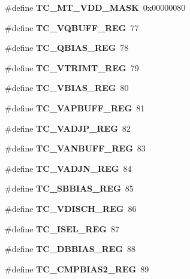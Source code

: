 \begin{DoxyCompactItemize}
\#define {\bfseries T\+C\+\_\+\+M\+T\+\_\+\+V\+D\+D\+\_\+\+M\+A\+SK}~0x00000080
\item 
\mbox{\label{_t_a_r_g_e_t_c___register_map_8h_a9479dfc6b7ea16de75f3f484bc33eb85}} 
\#define {\bfseries T\+C\+\_\+\+V\+Q\+B\+U\+F\+F\+\_\+\+R\+EG}~77
\item 
\mbox{\label{_t_a_r_g_e_t_c___register_map_8h_a851119f869d726fd2f491fe1a2f73c88}} 
\#define {\bfseries T\+C\+\_\+\+Q\+B\+I\+A\+S\+\_\+\+R\+EG}~78
\item 
\mbox{\label{_t_a_r_g_e_t_c___register_map_8h_ad8c2147fbc76ce5accfaf914e5618172}} 
\#define {\bfseries T\+C\+\_\+\+V\+T\+R\+I\+M\+T\+\_\+\+R\+EG}~79
\item 
\mbox{\label{_t_a_r_g_e_t_c___register_map_8h_aefc11a0ffdb29d47da553b0050f53ca9}} 
\#define {\bfseries T\+C\+\_\+\+V\+B\+I\+A\+S\+\_\+\+R\+EG}~80
\item 
\mbox{\label{_t_a_r_g_e_t_c___register_map_8h_a3b79a0397aab3ec3d35cf94070a9c730}} 
\#define {\bfseries T\+C\+\_\+\+V\+A\+P\+B\+U\+F\+F\+\_\+\+R\+EG}~81
\item 
\mbox{\label{_t_a_r_g_e_t_c___register_map_8h_a39420f232221429698f4a5d6b0316056}} 
\#define {\bfseries T\+C\+\_\+\+V\+A\+D\+J\+P\+\_\+\+R\+EG}~82
\item 
\mbox{\label{_t_a_r_g_e_t_c___register_map_8h_a715bc2cab8b7e6b65146677373a30bf4}} 
\#define {\bfseries T\+C\+\_\+\+V\+A\+N\+B\+U\+F\+F\+\_\+\+R\+EG}~83
\item 
\mbox{\label{_t_a_r_g_e_t_c___register_map_8h_a6ada6f68b8bb6491096841e849bdaacc}} 
\#define {\bfseries T\+C\+\_\+\+V\+A\+D\+J\+N\+\_\+\+R\+EG}~84
\item 
\mbox{\label{_t_a_r_g_e_t_c___register_map_8h_aeea124acb8e9b77a31c2cab08e970e19}} 
\#define {\bfseries T\+C\+\_\+\+S\+B\+B\+I\+A\+S\+\_\+\+R\+EG}~85
\item 
\mbox{\label{_t_a_r_g_e_t_c___register_map_8h_a13df1fcfc6c7eaebd8172059656a13ee}} 
\#define {\bfseries T\+C\+\_\+\+V\+D\+I\+S\+C\+H\+\_\+\+R\+EG}~86
\item 
\mbox{\label{_t_a_r_g_e_t_c___register_map_8h_ab5b96df1a3262e8aa6e63c70ec1c1439}} 
\#define {\bfseries T\+C\+\_\+\+I\+S\+E\+L\+\_\+\+R\+EG}~87
\item 
\mbox{\label{_t_a_r_g_e_t_c___register_map_8h_ad458afbd85deb47d8d03f6598c371b7b}} 
\#define {\bfseries T\+C\+\_\+\+D\+B\+B\+I\+A\+S\+\_\+\+R\+EG}~88
\item 
\mbox{\label{_t_a_r_g_e_t_c___register_map_8h_a8de727b19f1490c4a744512462df0ae5}} 
\#define {\bfseries T\+C\+\_\+\+C\+M\+P\+B\+I\+A\+S2\+\_\+\+R\+EG}~89

\end{DoxyCompactItemize}
